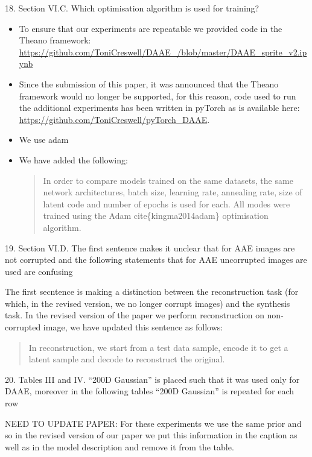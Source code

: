 \documentclass{article}
\begin{document}
{\color{blue}
18. Section VI.C. Which optimisation algorithm is used for training?}
\begin{itemize}
    \item To ensure that our experiments are repeatable we provided code in the Theano framework: \url{https://github.com/ToniCreswell/DAAE_/blob/master/DAAE_sprite_v2.ipynb}
    \item Since the submission of this paper, it was announced that the Theano framework would no longer be supported, for this reason, code used to run the additional experiments has been written in pyTorch as is available here: \url{https://github.com/ToniCreswell/pyTorch_DAAE}.
    \item We use adam
    \item We have added the following:
    \begin{quote}
        In order to compare models trained on the same datasets, the same network architectures, batch size, learning rate, annealing rate, size of latent code and number of epochs is used for each. All modes were trained using the Adam cite\{kingma2014adam\} optimisation algorithm.
    \end{quote}
\end{itemize}

{\color{blue}
19. Section VI.D. The first sentence makes it unclear that for AAE images are not corrupted and the following statements that for AAE uncorrupted images are used are confusing\\
}

{\color{red}
The first secntence is making a distinction between the reconstruction task (for which, in the revised version, we no longer corrupt images) and the synthesis task. In the revised version of the paper we perform reconstruction on non-corrupted image, we have updated this sentence as follows:

\begin{quote}
In reconstruction, we start from a test data sample, encode it to get a latent sample and decode to reconstruct the original. 
\end{quote}
}

{\color{blue}
20. Tables III and IV. ``200D Gaussian'' is placed such that it was used only for DAAE, moreover in the following tables ``200D Gaussian'' is repeated for each row\\
}

{\color{red} NEED TO UPDATE PAPER: For these experiments we use the same prior and so in the revised version of our paper we put this information in the caption as well as in the model description and remove it from the table.\\}
\end{document}
